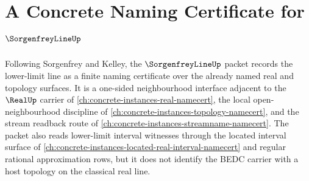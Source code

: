 \chapter{A Concrete Naming Certificate for $\SorgenfreyLineUp$}
\label{ch:concrete-instances-sorgenfrey-line-namecert}

Following Sorgenfrey and Kelley, the $\SorgenfreyLineUp$ packet records the lower-limit line as a finite naming certificate over the already named real and topology surfaces. It is a one-sided neighbourhood interface adjacent to the $\RealUp$ carrier of \autoref{ch:concrete-instances-real-namecert}, the local open-neighbourhood discipline of \autoref{ch:concrete-instances-topology-namecert}, and the stream readback route of \autoref{ch:concrete-instances-streamname-namecert}. The packet also reads lower-limit interval witnesses through the located interval surface of \autoref{ch:concrete-instances-located-real-interval-namecert} and regular rational approximation rows, but it does not identify the BEDC carrier with a host topology on the classical real line.

